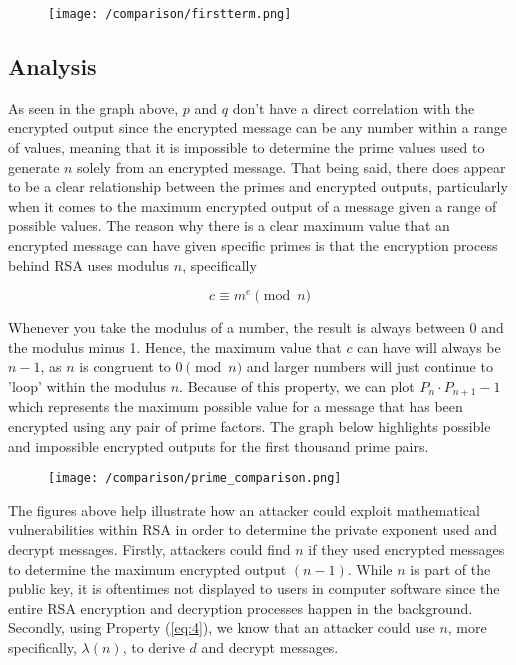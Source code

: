 \begin{figure}[ht]
    \centering
    \texttt{[image: /comparison/firstterm.png]}
\end{figure}

\subsection{Analysis}\label{sec:section6.2}
As seen in the graph above, $p$ and $q$ don't have a direct correlation with the encrypted output since the encrypted message can be any number within a range of values, meaning that it is impossible to determine the prime values used to generate $n$ solely from an encrypted message. That being said, there does appear to be a clear relationship between the primes and encrypted outputs, particularly when it comes to the maximum encrypted output of a message given a range of possible values. The reason why there is a clear maximum value that an encrypted message can have given specific primes is that the encryption process behind RSA uses modulus $n$, specifically 

$$
c \equiv m^{e} \pmod{n}
$$

Whenever you take the modulus of a number, the result is always between 0 and the modulus minus 1. Hence, the maximum value that $c$ can have will always be $n-1$, as $n$ is congruent to $0 \pmod{n}$ and larger numbers will just continue to 'loop' within the modulus $n$. Because of this property, we can plot $P_{n} \cdot P_{n+1} -1$ which represents the maximum possible value for a message that has been encrypted using any pair of prime factors. The graph below highlights possible and impossible encrypted outputs for the first thousand prime pairs.

\begin{figure}[H]
    \centering
    \texttt{[image: /comparison/prime\_comparison.png]}
\end{figure}

The figures above help illustrate how an attacker could exploit mathematical vulnerabilities within RSA in order to determine the private exponent used and decrypt messages.
Firstly, attackers could find $n$ if they used encrypted messages to determine the maximum encrypted output $(n-1)$. While $n$ is part of the public key, it is oftentimes not displayed to users in computer software since the entire RSA encryption and decryption processes happen in the background.
Secondly, using Property (\ref{eq:4}), we know that an attacker could use $n$, more specifically, $\lambda(n)$, to derive $d$ and decrypt messages.

